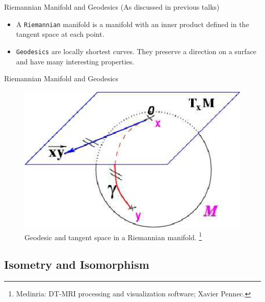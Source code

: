 \documentclass{beamer}
\begin{document}
\begin{frame}{Riemannian Manifold and Geodesics}
(As discussed in previous talks)
\begin{itemize}
\item A \texttt{Riemannian} manifold is a manifold with an inner product defined in the tangent space at each point.


\item \texttt{Geodesics} are locally shortest curves. They preserve a direction on a surface and have many interesting properties.
\end{itemize}

\end{frame}

\begin{frame}{Riemannian Manifold and Geodesics}

\begin{figure}
 \includegraphics[height=0.3\textwidth]{Geodesics2.png}
 \caption{\label{fig:Geodesics}Geodesic and tangent space in a Riemannian manifold. \footnote{Medinria: DT-MRI processing and visualization software; Xavier Pennec.}}
\end{figure}

\end{frame}


\subsection{Isometry and Isomorphism}
\end{document}
